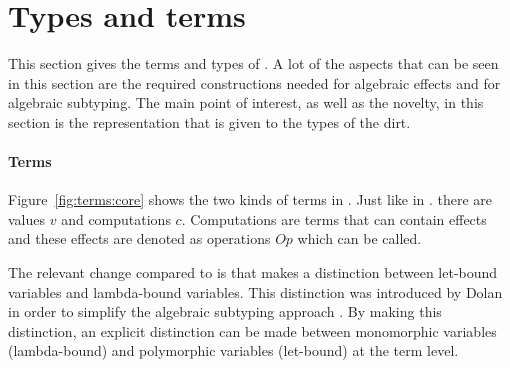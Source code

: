 \section{Types and terms}\label{typesterms}
This section gives the terms and types of \core. A lot of the aspects that can be seen in this section are the required constructions needed for algebraic effects and for algebraic subtyping. The main point of interest, as well as the novelty, in this section is the representation that is given to the types of the dirt. 

\paragraph{Terms}
Figure~\ref{fig:terms:core} shows the two kinds of terms in \core. Just like in \eff. there are values $v$ and computations $c$. Computations are terms that can contain effects and these effects are denoted as operations $Op$ which can be called. 

The relevant change compared to \eff is that \core makes a distinction between let-bound variables and lambda-bound variables. This distinction was introduced by Dolan in order to simplify the algebraic subtyping approach \cite{mlsub}. By making this distinction, an explicit distinction can be made between monomorphic variables (lambda-bound) and polymorphic variables (let-bound) at the term level.

